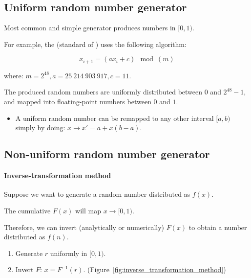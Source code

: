 \subsection{Uniform random number generator}
\label{subsec:uniform_random_number_generator}

Most common and simple generator produces numbers in $[0, 1)$.

For example, the  (standard of ) uses the following algorithm:

\begin{equation}\label{eq:lrand48}
	x_{i + 1} = (a x_{i} + c) \mod(m)
\end{equation}

where: $m = 2^{48}, a = 25 \ 214 \ 903 \ 917, c = 11$.

The produced random numbers are uniformly distributed between $0$ and $2^{48} - 1$, and mapped into floating-point numbers between $0$ and $1$.

\begin{itemize}[$\to$]
	\item A uniform random number can be remapped to any other interval $[a, b)$ simply by doing: $x \to x' = a + x(b - a)$.
\end{itemize}

\subsection{Non-uniform random number generator}
\label{subsec:non_uniform_random_number_generator}

\paragraph{Inverse-transformation method}

Suppose we want to generate a random number distributed as $f(x)$.

The cumulative $F(x)$ will map $x \to [0, 1)$.

Therefore, we can invert (analytically or numerically) $F(x)$ to obtain a number distributed as $f(n)$.

\begin{enumerate}
	\item Generate $r$ uniformly in $[0, 1)$.
	\item Invert $F$: $x = F^{-1}(r)$. (Figure~\ref{fig:inverse_transformation_method})
\end{enumerate}

